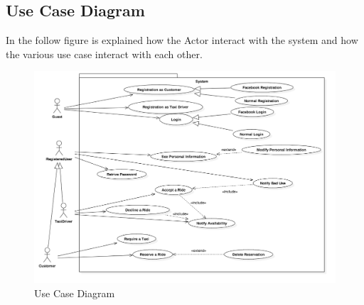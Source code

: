 \subsection{Use Case Diagram}
	In the follow figure is explained how the Actor interact with the system and how the various use case interact with each other.

				\begin{figure}[H]
					\centering
					\includegraphics[width=\textwidth, scale=0.5]{IMG/UseCaseDiagram.png}
					\caption{Use Case Diagram}\label{sec:UseCaseDiagramFigure}
				\end{figure}
				
				

				
